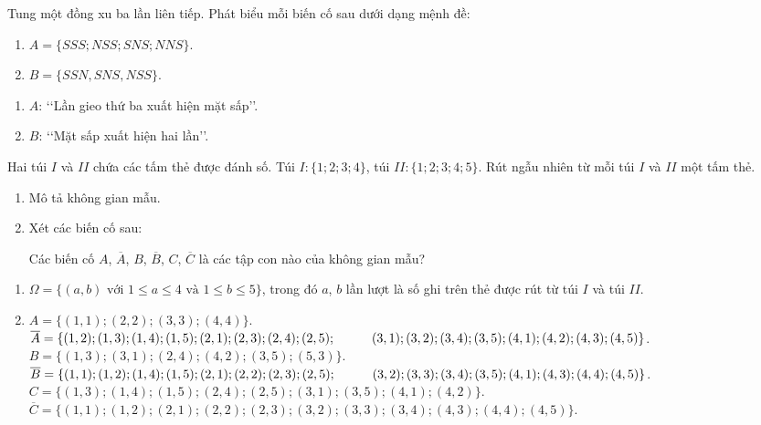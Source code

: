 \begin{bt}%
	Tung một đồng xu ba lần liên tiếp. Phát biểu mỗi biến cố sau dưới dạng mệnh đề:
	\begin{enumerate}
		\item $A=\{SSS; NSS; SNS; NNS\}$.
		\item $B=\{SSN, SNS, NSS\}$.
	\end{enumerate}
	\loigiai
	{
		\begin{enumerate}
			\item $A$: \lq\lq Lần gieo thứ ba xuất hiện mặt sấp\rq\rq.
			\item $B$: \lq\lq Mặt sấp xuất hiện hai lần\rq\rq.
		\end{enumerate}
	}
\end{bt}

\begin{bt}%
	Hai túi $I$ và $II$ chứa các tấm thẻ được đánh số. Túi $I \colon \{1; 2; 3; 4\}$, túi $II \colon \{1; 2; 3; 4; 5\}$. Rút ngẫu nhiên từ mỗi túi $I$ và $II$ một tấm thẻ.
	\begin{enumerate}
		\item Mô tả không gian mẫu.
		\item Xét các biến cố sau:
		Các biến cố $A$, $\overline{A}$, $B$, $\overline{B}$, $C$, $\overline{C}$ là các tập con nào của không gian mẫu?
	\end{enumerate}
	\loigiai
	{
		\begin{enumerate}
			\item $\Omega= \{(a,b) \text{ với } 1\le a\le 4 \text{ và } 1\le b\le 5\}$, trong đó $a$, $b$ lần lượt là số ghi trên thẻ được rút từ túi $I$ và túi $II$.
			\item $A=\{(1,1); (2,2); (3,3); (4,4)\}$.\\
			$\overline{A}= \{(1,2); (1,3); (1,4); (1,5); (2,1); (2,3); (2,4); (2,5);\\
			\hspace*{1cm} (3,1); (3,2); (3,4); (3,5); (4,1); (4,2); (4,3); (4,5)\}$.\\
			$B= \{(1,3); (3,1); (2,4); (4,2); (3,5); (5,3)\}$.\\
			$\overline{B}=\{(1,1); (1,2); (1,4); (1,5); (2,1); (2,2); (2,3); (2,5);\\
			\hspace*{1cm} (3,2); (3,3); (3,4); (3,5); (4,1); (4,3); (4,4); (4,5)\}$.\\
			$C=\{(1,3); (1,4); (1,5); (2,4); (2,5); (3,1); (3,5); (4,1); (4,2)\}$.\\
			$\overline{C}=\{(1,1); (1,2); (2,1); (2,2); (2,3); (3,2); (3,3); (3,4); (4,3); (4,4); (4,5)\}$.
		\end{enumerate}
	}
\end{bt}

